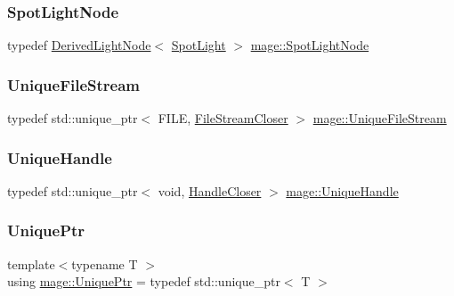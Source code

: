 \subsubsection{\texorpdfstring{Spot\+Light\+Node}{SpotLightNode}}
{\footnotesize\ttfamily typedef \hyperlink{classmage_1_1_derived_light_node}{Derived\+Light\+Node}$<$ \hyperlink{classmage_1_1_spot_light}{Spot\+Light} $>$ \hyperlink{namespacemage_a46c8f54b869a5dc07f520c600b9046bd}{mage\+::\+Spot\+Light\+Node}}

\hypertarget{namespacemage_a679c1b707dee02c7eab8d706ef14411a}{}\label{namespacemage_a679c1b707dee02c7eab8d706ef14411a} 
\subsubsection{\texorpdfstring{Unique\+File\+Stream}{UniqueFileStream}}
{\footnotesize\ttfamily typedef std\+::unique\+\_\+ptr$<$ F\+I\+LE, \hyperlink{structmage_1_1_file_stream_closer}{File\+Stream\+Closer} $>$ \hyperlink{namespacemage_a679c1b707dee02c7eab8d706ef14411a}{mage\+::\+Unique\+File\+Stream}}

\hypertarget{namespacemage_a284e84e551a05d4fc6c957985b2de3ed}{}\label{namespacemage_a284e84e551a05d4fc6c957985b2de3ed} 
\subsubsection{\texorpdfstring{Unique\+Handle}{UniqueHandle}}
{\footnotesize\ttfamily typedef std\+::unique\+\_\+ptr$<$ void, \hyperlink{structmage_1_1_handle_closer}{Handle\+Closer} $>$ \hyperlink{namespacemage_a284e84e551a05d4fc6c957985b2de3ed}{mage\+::\+Unique\+Handle}}

\hypertarget{namespacemage_a8c307fbcc33bce9b7f2aa4c26c3b95cf}{}\label{namespacemage_a8c307fbcc33bce9b7f2aa4c26c3b95cf} 
\subsubsection{\texorpdfstring{Unique\+Ptr}{UniquePtr}}
{\footnotesize\ttfamily template$<$typename T $>$ \\
using \hyperlink{namespacemage_a8c307fbcc33bce9b7f2aa4c26c3b95cf}{mage\+::\+Unique\+Ptr} = typedef std\+::unique\+\_\+ptr$<$ T $>$}

